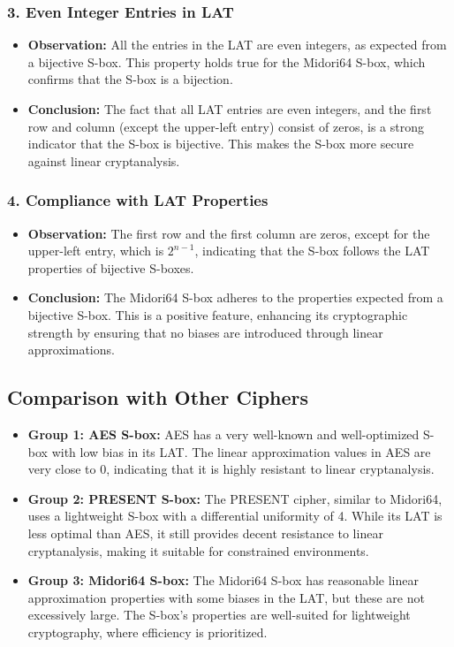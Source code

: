 \documentclass[10pt, a4paper]{article}
\begin{document}
\subsubsection*{3. Even Integer Entries in LAT}
\begin{itemize}
	\item \textbf{Observation:} All the entries in the LAT are even integers, as
	      expected from a bijective S-box. This property holds true for the Midori64
	      S-box, which confirms that the S-box is a bijection.
	\item \textbf{Conclusion:} The fact that all LAT entries are even integers,
	      and the first row and column (except the upper-left entry) consist of zeros,
	      is a strong indicator that the S-box is bijective. This makes the S-box more
	      secure against linear cryptanalysis.
\end{itemize}

\subsubsection*{4. Compliance with LAT Properties}
\begin{itemize}
	\item \textbf{Observation:} The first row and the first column are zeros,
	      except for the upper-left entry, which is $2^{n-1}$, indicating that the
	      S-box follows the LAT properties of bijective S-boxes.
	\item \textbf{Conclusion:} The Midori64 S-box adheres to the properties
	      expected from a bijective S-box. This is a positive feature, enhancing its
	      cryptographic strength by ensuring that no biases are introduced through
	      linear approximations.
\end{itemize}


\subsection*{Comparison with Other Ciphers}

\begin{itemize}
	\item \textbf{Group 1: AES S-box:} AES has a very well-known and well-optimized S-box
	      with low bias in its LAT. The linear approximation values in AES are very
	      close to 0, indicating that it is highly resistant to linear cryptanalysis.
	\item \textbf{Group 2: PRESENT S-box:} The PRESENT cipher, similar to Midori64, uses
	      a lightweight S-box with a differential uniformity of 4. While its LAT is
	      less optimal than AES, it still provides decent resistance to linear
	      cryptanalysis, making it suitable for constrained environments.
	\item \textbf{Group 3: Midori64 S-box:} The Midori64 S-box has reasonable linear
	      approximation properties with some biases in the LAT, but these are not
	      excessively large. The S-box’s properties are well-suited for lightweight
	      cryptography, where efficiency is prioritized.
\end{itemize}
\end{document}
